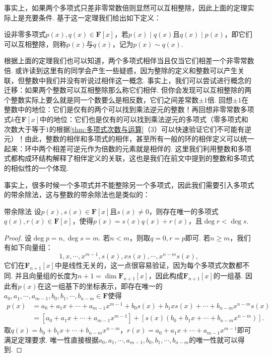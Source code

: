 事实上，如果两个多项式只差非零常数倍则显然可以互相整除，因此上面的定理实际上是充要条件. 基于这一定理我们给出如下定义：
\begin{definition}{}{}
    设非零多项式$p(x),q(x)\in\mathbf{F}[x]$，若$p(x)\mid q(x)$且$q(x)\mid p(x)$，即它们可以互相整除，则称$p(x)$与$q(x)$，记为$p(x)\sim q(x)$.
\end{definition}

根据上面的定理我们也可以知道，两个多项式相伴当且仅当它们相差一个非零常数倍. 或许读到这里有的同学会产生一些疑惑，因为整除的定义和整数可以产生关联，但整数中我们并没有听说过相伴这一概念. 事实上，我们可以尝试进行概念的迁移：如果两个整数可以互相整除那么称它们相伴. 但你会发现可以互相整除的两个整数实际上要么就是同一个数要么是相反数，它们之间差常数$\pm 1$倍. 回想$\pm 1$在整数中的地位：它们是仅有的两个可以找到乘法逆元的整数！再回想非零常数多项式$k$在$\mathbf{F}[x]$中的地位：它们也是仅有的可以找到乘法逆元的多项式（零多项式和次数大于等于$1$的根据\autoref{thm:多项式次数与运算}（3）可以快速验证它们不可能有逆元）！由此，整数的相伴和多项式的相伴，甚至所有一般的环的相伴定义可以统一起来：环中两个相差可逆元作为倍数的元素就是相伴的. 这里我们利用整数和多项式都构成环结构解释了相伴定义的关联，这也是我们在前文中提到的整数和多项式的相似性的一个体现.

事实上，很多时候一个多项式并不能整除另一个多项式，因此我们需要引入多项式的带余除法，这与整数的带余除法也是类似的：
\begin{theorem}{}{带余除法}
    设$p(x),s(x)\in\mathbf{F}[x]$且$s(x)\neq 0$，则存在唯一的多项式$q(x),r(x)\in\mathbf{F}[x]$，使得$p(x)=s(x)q(x)+r(x)$，且$\deg r<\deg s$.
\end{theorem}
\begin{proof}
    设$\deg p=n,\deg s=m$. 若$n<m$，则取$q=0,r=p$即可. 若$n\geqslant m$，我们有如下向量组：
    \[1,x,\cdots,x^{m-1},s(x),xs(x),\cdots,x^{n-m}s(x),\]
    它们在$\mathbf{F}_{n+1}[x]$中是线性无关的，这一点很容易验证，因为每个多项式次数都不同. 并且向量组的长度为$n+1=\dim\mathbf{F}_{n+1}[x]$，因此构成$\mathbf{F}_{n+1}[x]$的一组基. 因此有$p(x)$在这一组基下的坐标表示，即存在唯一的$a_0,a_1,\cdots,a_{m-1},b_0,b_1,\cdots,b_{n-m}\in\mathbf{F}$使得
    \begin{align*}
        p(x) & =a_0+a_1x+\cdots+a_{m-1}x^{m-1}+b_0s(x)+b_1xs(x)+\cdots+b_{n-m}x^{n-m}s(x) \\
             & =[a_0+a_1x+\cdots+a_{m-1}x^{m-1}]+[s(x)(b_0+b_1x+\cdots+b_{n-m}x^{n-m})].
    \end{align*}
    取$q(x)=b_0+b_1x+\cdots+b_{n-m}x^{n-m}$，$r(x)=a_0+a_1x+\cdots+a_{m-1}x^{m-1}$即可满足定理要求. 唯一性直接根据$a_0,a_1,\cdots,a_{m-1},b_0,b_1,\cdots,b_{n-m}$的唯一性就可以得到.
\end{proof}

